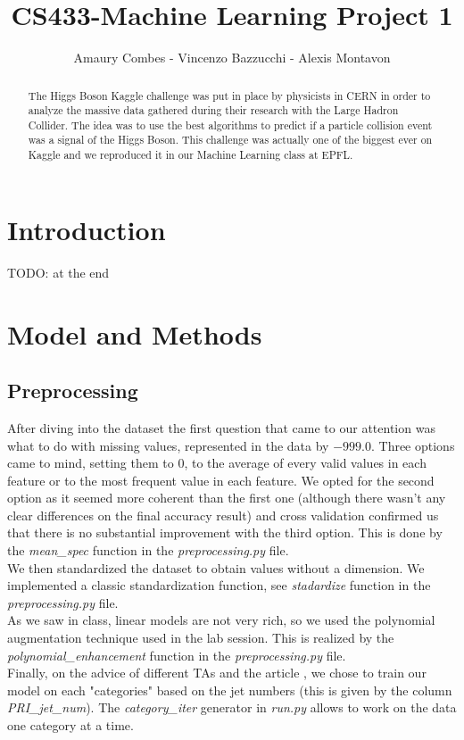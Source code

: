 \documentclass[10pt,conference,compsocconf]{IEEEtran}
\begin{document}
\title{CS433-Machine Learning Project 1}

\author{
  Amaury Combes - Vincenzo Bazzucchi - Alexis Montavon\\
}

\maketitle

\begin{abstract}
  The Higgs Boson Kaggle challenge was put in place by physicists in CERN in order to analyze the massive data gathered during their research with the Large Hadron Collider. The idea was to use the best algorithms to predict if a particle collision event was a signal of the Higgs Boson. This challenge was actually one of the biggest ever on Kaggle and we reproduced it in our Machine Learning class at EPFL.
\end{abstract}

\section{Introduction}

TODO: at the end

\section{Model and Methods}
\label{sec:model}
\subsection{Preprocessing}
After diving into the dataset the first question that came to our attention was what to do with missing values, represented in the data by $-999.0$. Three options came to mind, setting them to $0$, to the average of every valid values in each feature or to the most frequent value in each feature. We opted for the second option as it seemed more coherent than the first one (although there wasn't any clear differences on the final accuracy result) and cross validation confirmed us that there is no substantial improvement with the third option. This is done by the \textit{mean\_spec} function in the \textit{preprocessing.py} file.\\
We then standardized the dataset to obtain values without a dimension. We implemented a classic standardization function, see \textit{stadardize} function in the \textit{preprocessing.py} file.\\ As we saw in class, linear models are not very rich, so we used the polynomial augmentation technique used in the lab session. This is realized by the \textit{polynomial\_enhancement} function in the \textit{preprocessing.py} file.\\
Finally, on the advice of different TAs and the article \cite{anderson04}, we chose to train our model on each "categories" based on the jet numbers (this is given by the column \textit{PRI\_jet\_num}). The \textit{category\_iter} generator in \textit{run.py} allows to work on the data one category at a time.
\end{document}
